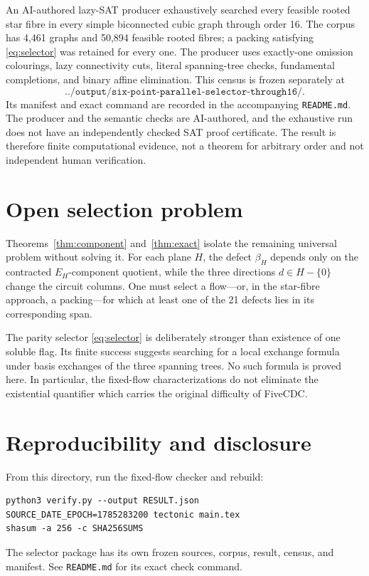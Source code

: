 \documentclass[11pt]{article}
\theoremstyle{definition}
\theoremstyle{remark}
\newcommand{\FiveCDC}{\textup{FiveCDC}}
\numberwithin{equation}{section}
\begin{document}
An AI-authored lazy-SAT producer exhaustively searched every feasible
rooted star fibre in every simple biconnected cubic graph through order
16.  The corpus has 4,461 graphs and 50,894 feasible rooted fibres; a
packing satisfying \eqref{eq:selector} was retained for every one.  The
producer uses exactly-one omission colourings, lazy connectivity cuts,
literal spanning-tree checks, fundamental completions, and binary affine
elimination.  This census is frozen separately at
\[
\texttt{../output/six-point-parallel-selector-through16/}.
\]
Its manifest and exact command are recorded in the accompanying
\texttt{README.md}.  The producer and the semantic checks are AI-authored,
and the exhaustive run does not have an independently checked SAT proof
certificate.  The result is therefore finite computational evidence, not
a theorem for arbitrary order and not independent human verification.

\section{Open selection problem}

Theorems~\ref{thm:component} and~\ref{thm:exact} isolate the remaining
universal problem without solving it.  For each plane \(H\), the defect
\(\beta_H\) depends only on the contracted \(E_H\)-component quotient,
while the three directions \(d\in H-\{0\}\) change the circuit columns.
One must select a flow---or, in the star-fibre approach, a packing---for
which at least one of the 21 defects lies in its corresponding span.

The parity selector \eqref{eq:selector} is deliberately stronger than
existence of one soluble flag.  Its finite success suggests searching
for a local exchange formula under basis exchanges of the three
spanning trees.  No such formula is proved here.  In particular, the
fixed-flow characterizations do not eliminate the existential quantifier
which carries the original difficulty of \FiveCDC.

\section*{Reproducibility and disclosure}

From this directory, run the fixed-flow checker and rebuild:
\begin{verbatim}
python3 verify.py --output RESULT.json
SOURCE_DATE_EPOCH=1785283200 tectonic main.tex
shasum -a 256 -c SHA256SUMS
\end{verbatim}
The selector package has its own frozen sources, corpus, result, census,
and manifest.  See \texttt{README.md} for its exact check command.
\end{document}
